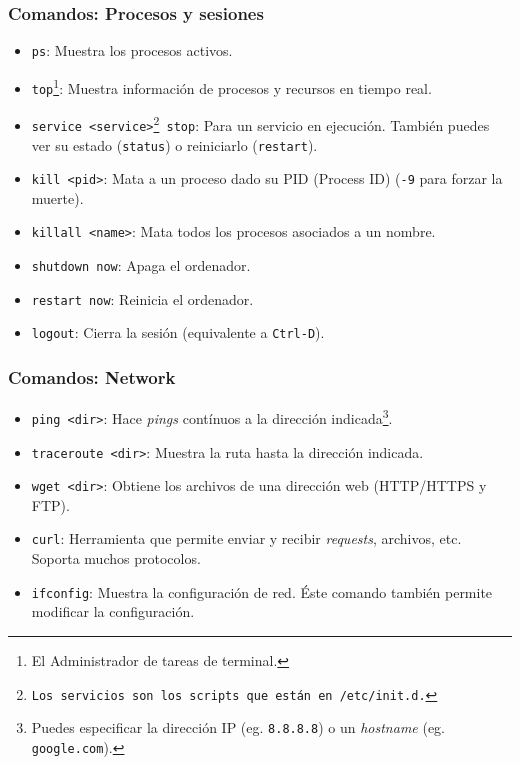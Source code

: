 \documentclass[aspectratio=43]{beamer}
\begin{document}
\begin{frame}
    \frametitle{Comandos: Procesos y sesiones}

    \begin{itemize}
        \item \texttt{ps}: Muestra los procesos activos.
        \item \texttt{top}\footnote{El Administrador de tareas de terminal.}: Muestra información de procesos y recursos en tiempo real.
        \item \texttt{service <service>\footnote{Los servicios son los scripts que están en \texttt{/etc/init.d}.} stop}: Para un servicio en ejecución. También puedes ver su estado (\texttt{status}) o reiniciarlo (\texttt{restart}).
        \item \texttt{kill <pid>}: Mata a un proceso dado su PID (Process ID) (\texttt{-9} para forzar la muerte).
        \item \texttt{killall <name>}: Mata todos los procesos asociados a un nombre.
    \end{itemize}
    \vspace{8pt}
    \begin{itemize}
        \item \texttt{shutdown now}: Apaga el ordenador.
        \item \texttt{restart now}: Reinicia el ordenador.
        \item \texttt{logout}: Cierra la sesión (equivalente a \texttt{Ctrl-D}).
    \end{itemize}

\end{frame}


\begin{frame}
    \frametitle{Comandos: Network}

    \begin{itemize}
        \item \texttt{ping <dir>}: Hace \textit{pings} contínuos a la dirección indicada\footnote{Puedes especificar la dirección IP (eg. \texttt{8.8.8.8}) o un \textit{hostname} (eg. \texttt{google.com}).}.
        \item \texttt{traceroute <dir>}: Muestra la ruta hasta la dirección indicada.
        \item \texttt{wget <dir>}: Obtiene los archivos de una dirección web (HTTP/HTTPS y FTP).
        \item \texttt{curl}: Herramienta que permite enviar y recibir \textit{requests}, archivos, etc. Soporta muchos protocolos.
        \item \texttt{ifconfig}: Muestra la configuración de red. Éste comando también permite modificar la configuración.
    \end{itemize}

\end{frame}
\end{document}
